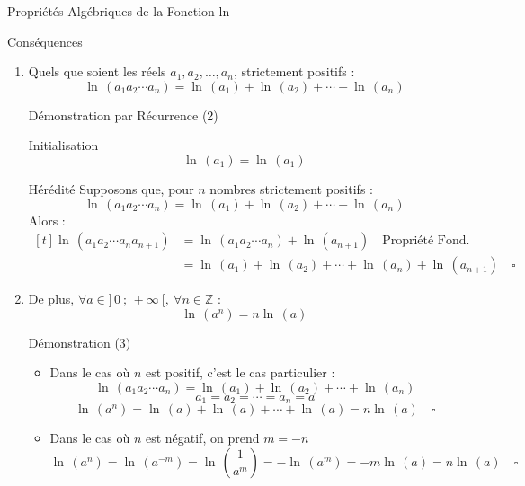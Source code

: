 \documentclass{cours}
\begin{document}
\begin{Gpartie}{Propriétés Algébriques de la Fonction ln}
\begin{Spartie}{Conséquences}
\begin{enumerate}[(1)]
\begin{SSpartie}{Démonstration (1)}
                    La deuxième égalité est le cas particulier où $a=1$.$\quad\square$
                \end{SSpartie}
                \item Quels que soient les réels $a_1, a_2,\dotsc, a_n$, strictement positifs : 
                \[\boxed{\ln\,(a_1a_2\dotsb a_n)=\ln\,(a_1)+\ln\,(a_2)+\dotsb+\ln\,(a_n)}\]
                \pagebreak
                \begin{SSpartie}{Démonstration par Récurrence (2)}
                    \begin{SSSpartie}{Initialisation}
                        \[\ln\,(a_1)=\ln\,(a_1)\]
                    \end{SSSpartie}
                    \begin{SSSpartie}{Hérédité}
                        Supposons que, pour $n$ nombres strictement positifs :
                        \[\ln\,(a_1a_2\dotsb a_n)=\ln\,(a_1)+\ln\,(a_2)+\dotsb+\ln\,(a_n)\]
                        Alors :
                        \[\begin{aligned}[t]
                            \ln\,(a_1a_2\dotsb a_na_{n+1})&=\ln\,(a_1a_2\dotsb a_n)+\ln\,(a_{n+1})\quad\text{Propriété Fond.} \\
                            &=\ln\,(a_1)+\ln\,(a_2)+\dotsb+\ln\,(a_n)+\ln\,(a_{n+1})\quad\square
                        \end{aligned}\]
                    \end{SSSpartie}
                \end{SSpartie}
                \item De plus, $\forall a\in\big]\,0~;\,+\infty~\big[,~\forall n\in\mathbb{Z}$ :
                \[\boxed{\ln\,\left(a^n\right)=n\ln\,(a)}\]
                \begin{SSpartie}{Démonstration (3)}
                    \begin{itemize}
                        \item Dans le cas où $n$ est positif, c'est le cas particulier :
                        \[\ln\,(a_1a_2\dotsb a_n)=\ln\,(a_1)+\ln\,(a_2)+\dotsb+\ln\,(a_n)\]
                        \[a_1=a_2=\dotsb=a_n=a\]
                        \[\ln\,(a^n)=\ln\,(a)+\ln\,(a)+\dotsb+\ln\,(a)=n\ln\,(a)\quad\square\]
                        \item Dans le cas où $n$ est négatif, on prend $m=-n$
                        \[\ln\,(a^n)=\ln\,(a^{-m})=\ln\,\left(\frac{1}{a^m}\right)=-\ln\,(a^m)=-m\ln\,(a)=n\ln\,(a)\quad\square\]
                    \end{itemize}

\end{SSpartie}
\end{enumerate}
\end{Spartie}
\end{Gpartie}
\end{document}
